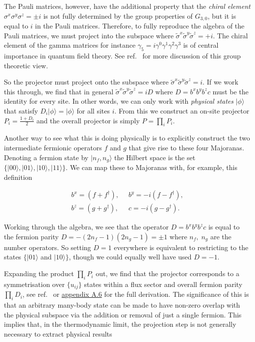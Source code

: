 The Pauli matrices, however, have the additional property that the \emph{chiral element} \(\sigma^x \sigma^y \sigma^z = \pm i\) is not fully determined by the group properties of \(G_{3,0}\), but it is equal to \(i\) in the Pauli matrices. Therefore, to fully reproduce the algebra of the Pauli matrices, we must project into the subspace where \(\tilde{\sigma}^x \tilde{\sigma}^y \tilde{\sigma}^z = +i\). The chiral element of the gamma matrices for instance \(\gamma_5 = i\gamma^0 \gamma^1 \gamma^2 \gamma^3\) is of central importance in quantum field theory. See ref.~\autocite{petitjeanChiralityDiracSpinors2020} for more discussion of this group theoretic view.

So the projector must project onto the subspace where \(\tilde \sigma^x \tilde \sigma^y \tilde \sigma^z = i\). If we work this through, we find that in general \(\tilde \sigma^x \tilde \sigma^y \tilde\sigma^z = iD\) where \(D = b^x b^y b^z c\) must be the identity for every site. In other words, we can only work with \emph{physical states} \(|\phi\rangle\) that satisfy \(D_i|\phi\rangle = |\phi\rangle\) for all sites \(i\). From this we construct an on-site projector \(P_i = \frac{1 + D_i}{2}\) and the overall projector is simply \(P = \prod_i P_i\).

Another way to see what this is doing physically is to explicitly construct the two intermediate fermionic operators \(f\) and \(g\) that give rise to these four Majoranas. Denoting a fermion state by \(|n_f, n_g\rangle\) the Hilbert space is the set \(\{|00\rangle,|01\rangle,|10\rangle,|11\rangle\}\). We can map these to Majoranas with, for example, this definition

\[\begin{aligned}
b^x = (f + f^\dagger),\;\;& b^y = -i(f - f^\dagger),\\
b^z = (g + g^\dagger),\;\;& c = -i(g - g^\dagger).
\end{aligned}\]

Working through the algebra, we see that the operator \(D = b^x b^y b^z c\) is equal to the fermion parity \(D = -(2n_f - 1)(2n_g - 1) = \pm1\) where \(n_f,\; n_g\) are the number operators. So setting \(D = 1\) everywhere is equivalent to restricting to the states \(\{|01\rangle\) and \(|10\rangle\}\), though we could equally well have used \(D = -1\).

Expanding the product \(\prod_i P_i\) out, we find that the projector corresponds to a symmetrisation over \(\{u_{ij}\}\) states within a flux sector and overall fermion parity \(\prod_i D_i\), see ref.~\autocite{pedrocchiPhysicalSolutionsKitaev2011} or \protect\hyperlink{app-the-projector}{appendix A.6} for the full derivation. The significance of this is that an arbitrary many-body state can be made to have non-zero overlap with the physical subspace via the addition or removal of just a single fermion. This implies that, in the thermodynamic limit, the projection step is not generally necessary to extract physical results

